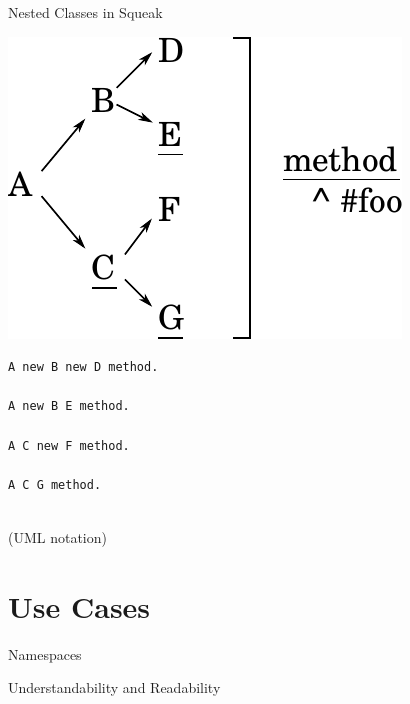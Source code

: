 \documentclass[xcolor=dvipsname, handout]{beamer} %
\begin{document}
\begin{frame}[fragile]{Nested Classes in Squeak}
\begin{minipage}{.5\textwidth}
  \includegraphics[width=\textwidth]{nested_classes.pdf}
\end{minipage}%
\begin{minipage}{.1\textwidth}
\qquad
\end{minipage}%
\begin{minipage}{.4\textwidth}
  \begin{lstlisting}
A new B new D method.

A new B E method.

A C new F method.

A C G method.


  \end{lstlisting}
(UML notation)

\end{minipage}


\end{frame}

\section{Use Cases}
\begin{frame}{Namespaces}

\end{frame}

\begin{frame}{Understandability and Readability}

\end{frame}
\end{document}
